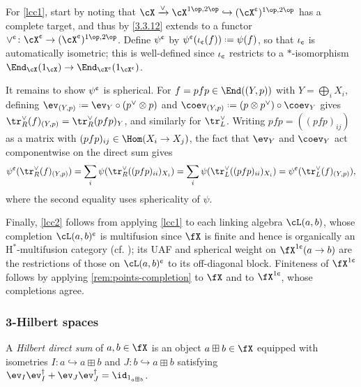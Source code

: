 \documentclass[12pt,reqno]{amsart}
\newcommand{\Hstar}{\ensuremath{\mathrm{H}^{*}}}
\newcommand{\defn}[1]{\emph{#1}}
\newcommand{\cent}{\textup{\textcent}}
\DeclareRobustCommand{\coloneq}{\mathrel{\vcenter{\baselineskip0.5ex\lineskiplimit0pt\hbox{\scriptsize{\upshape.}}\hbox{\scriptsize{\upshape.}}}}=}
\begin{document}
\begin{pf}
  For \ref{lcc1}, start by noting that $\cX \xrightarrow{\vee} \cX^{1\op,2\op} \hookrightarrow (\cX^{\cent})^{1\op,2\op}$ has a complete target, and thus by \cref{3.3.12} extends to a functor $\vee^{\cent} \colon \cX^{\cent} \to (\cX^{\cent})^{1\op,2\op}$. Define $\psi^{\cent}$ by $\psi^{\cent}(\iota_{\cent}(f)) \coloneq \psi(f)$, so that $\iota_\cent$ is automatically isometric; this is well-defined since $\iota_{\cent}$ restricts to a $*$-isomorphism $\End_\cX(1_\cX)\to\End_{\cX^{\cent}}(1_{\cX^{\cent}})$.
  
  It remains to show $\psi^\cent$ is spherical. For $f = pfp \in \End((Y,p))$ with $Y = \bigoplus_i X_i$, defining $\ev_{(Y,p)} \coloneq \ev_Y \circ (p^\vee \otimes p)$ and $\coev_{(Y,p)} \coloneq (p \otimes p^\vee) \circ \coev_Y$ gives $\tr^\vee_R(f)_{(Y,p)} = \tr^\vee_R(pfp)_Y$, and similarly for $\tr^\vee_L$. Writing $pfp = ((pfp)_{ij})$ as a matrix with $(pfp)_{ij} \in \Hom(X_i \to X_j)$, the fact that $\ev_Y$ and $\coev_Y$ act componentwise on the direct sum gives
  \[
    \psi^{\cent}(\tr^\vee_R(f)_{(Y,p)})
    = \sum_i \psi(\tr^\vee_R((pfp)_{ii})_{X_i})
    = \sum_i \psi(\tr^\vee_L((pfp)_{ii})_{X_i})
    = \psi^{\cent}(\tr^\vee_L(f)_{(Y,p)}),
  \]
  where the second equality uses sphericality of $\psi$.

    Finally, \ref{lcc2} follows from applying \ref{lcc1} to each linking algebra $\cL(a,b)$, whose completion $\cL(a,b)^\cent$ is multifusion since $\fX$ is finite and hence is organically an $\Hstar$-multifusion category (cf. \cite[Exm. 4.5]{3Hilb}); its UAF and spherical weight on $\fX^{1\cent}(a\to b)$ are the restrictions of those on $\cL(a,b)^{\cent}$ to its off-diagonal block. Finiteness of $\fX^{1\cent}$ follows by applying \cref{rem:points-completion} to $\fX$ and to $\fX^{1\cent}$, whose completions agree.
\end{pf}

\subsubsection{3-Hilbert spaces}
\begin{definition}
  A \defn{Hilbert direct sum} of $a,b\in\fX$ is an object $a\boxplus b\in\fX$ equipped with isometries $I\colon a\hookrightarrow a\boxplus b$ and $J\colon b\hookrightarrow a\boxplus b$ satisfying $\ev_I\ev_I^\dag+\ev_J\ev_J^\dag=\id_{1_{a\boxplus b}}$.
\end{definition}
\end{document}
